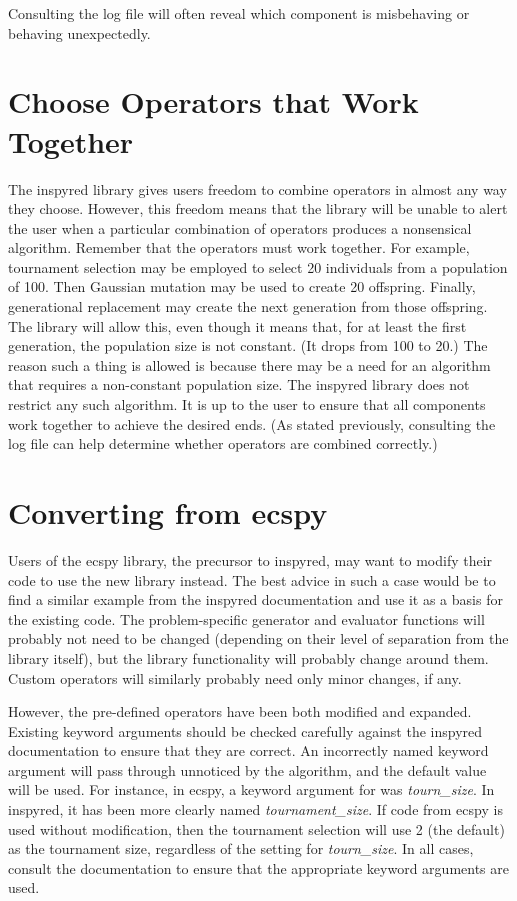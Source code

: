 \documentclass[letterpaper,10pt,english]{sphinxmanual}
\begin{document}
Consulting the log file will often reveal which component is misbehaving or behaving unexpectedly.


\section{Choose Operators that Work Together}
\label{troubleshooting:choose-operators-that-work-together}
The inspyred library gives users freedom to combine operators in almost any way they choose. However, this freedom means that the library will be unable to alert the user when a particular combination of operators produces a nonsensical algorithm. Remember that the operators must work together. For example, tournament selection may be employed to select 20 individuals from a population of 100. Then Gaussian mutation may be used to create 20 offspring. Finally, generational replacement may create the next generation from those offspring. The library will allow this, even though it means that, for at least the first generation, the population size is not constant. (It drops from 100 to 20.) The reason such a thing is allowed is because there may be a need for an algorithm that requires a non-constant population size. The inspyred library does not restrict any such algorithm. It is up to the user to ensure that all components work together to achieve the desired ends. (As stated previously, consulting the log file can help determine whether operators are combined correctly.)


\section{Converting from ecspy}
\label{troubleshooting:converting-from-ecspy}
Users of the ecspy library, the precursor to inspyred, may want to modify their code to use the new library instead. The best advice in such a case would be to find a similar example from the inspyred documentation and use it as a basis for the existing code. The problem-specific generator and evaluator functions will probably not need to be changed (depending on their level of separation from the library itself), but the library functionality will probably change around them. Custom operators will similarly probably need only minor changes, if any.

However, the pre-defined operators have been both modified and expanded. Existing keyword arguments should be checked carefully against the inspyred documentation to ensure that they are correct. An incorrectly named keyword argument will pass through unnoticed by the algorithm, and the default value will be used. For instance, in ecspy, a keyword argument for  was \emph{tourn\_size}. In inspyred, it has been more clearly named \emph{tournament\_size}. If code from ecspy is used without modification, then the tournament selection will use 2 (the default) as the tournament size, regardless of the setting for \emph{tourn\_size}. In all cases, consult the documentation to ensure that the appropriate keyword arguments are used.
\end{document}
